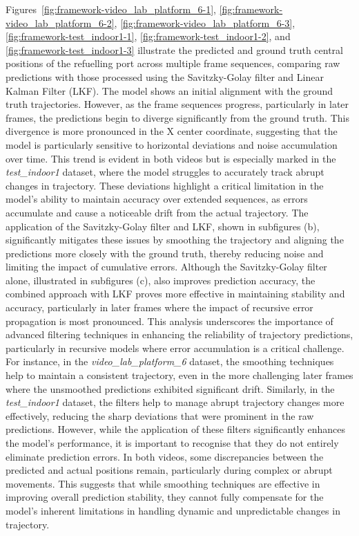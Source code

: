 \documentclass[12pt,oneside]{book} %
\begin{document}
\newpage

Figures~\ref{fig:framework-video_lab_platform_6-1},
\ref{fig:framework-video_lab_platform_6-2},
\ref{fig:framework-video_lab_platform_6-3}, \ref{fig:framework-test_indoor1-1},
\ref{fig:framework-test_indoor1-2}, and \ref{fig:framework-test_indoor1-3}
illustrate the predicted and ground truth central positions of the refuelling
port across multiple frame sequences, comparing raw predictions with those
processed using the Savitzky-Golay filter and Linear Kalman Filter (LKF). The
model shows an initial alignment with the ground truth trajectories. However,
as the frame sequences progress, particularly in later frames, the predictions
begin to diverge significantly from the ground truth. This divergence is more
pronounced in the X center coordinate, suggesting that the model is
particularly sensitive to horizontal deviations and noise accumulation over
time. This trend is evident in both videos but is especially marked in the
\textit{test\_indoor1} dataset, where the model struggles to accurately track
abrupt changes in trajectory. These deviations highlight a critical limitation
in the model's ability to maintain accuracy over extended sequences, as errors
accumulate and cause a noticeable drift from the actual trajectory. The
application of the Savitzky-Golay filter and LKF, shown in subfigures (b),
significantly mitigates these issues by smoothing the trajectory and aligning
the predictions more closely with the ground truth, thereby reducing noise and
limiting the impact of cumulative errors. Although the Savitzky-Golay filter
alone, illustrated in subfigures (c), also improves prediction accuracy, the
combined approach with LKF proves more effective in maintaining stability and
accuracy, particularly in later frames where the impact of recursive error
propagation is most pronounced. This analysis underscores the importance of
advanced filtering techniques in enhancing the reliability of trajectory
predictions, particularly in recursive models where error accumulation is a
critical challenge. For instance, in the \textit{video\_lab\_platform\_6}
dataset, the smoothing techniques help to maintain a consistent trajectory,
even in the more challenging later frames where the unsmoothed predictions
exhibited significant drift. Similarly, in the \textit{test\_indoor1} dataset,
the filters help to manage abrupt trajectory changes more effectively, reducing
the sharp deviations that were prominent in the raw predictions. However, while
the application of these filters significantly enhances the model's
performance, it is important to recognise that they do not entirely eliminate
prediction errors. In both videos, some discrepancies between the predicted and
actual positions remain, particularly during complex or abrupt movements. This
suggests that while smoothing techniques are effective in improving overall
prediction stability, they cannot fully compensate for the model's inherent
limitations in handling dynamic and unpredictable changes in trajectory. 
\end{document}
